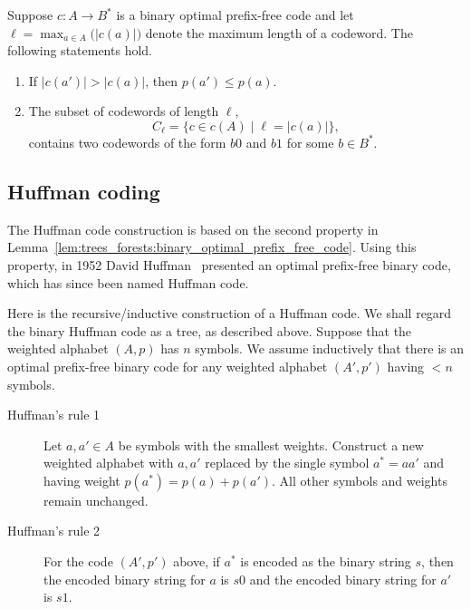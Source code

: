 \begin{lemma}
\label{lem:trees_forests:binary_optimal_prefix_free_code}
Suppose $c: A \longrightarrow B^*$ is a binary optimal prefix-free
code and let $\ell = \max_{a \in A} \big(|c(a)|\big)$ denote the
maximum length of a codeword. The following statements hold.
%
\begin{enumerate}
\item If $|c(a')|>|c(a)|$, then $p(a')\leq p(a)$.

\item The subset of codewords of length $\ell$,
\[
C_\ell
=
\{c \in c(A) \;|\; \ell = |c(a)|\},
\]
contains two codewords of the form $b0$ and $b1$ for some $b \in B^*$.
\end{enumerate}
\end{lemma}



\subsection{Huffman coding}

The Huffman code construction is based on the second property in
Lemma~\ref{lem:trees_forests:binary_optimal_prefix_free_code}. Using
this property, in 1952 David Huffman~\cite{Huffman1952} presented an
optimal prefix-free binary code, which has since been named Huffman
code.

Here is the recursive/inductive construction of a Huffman code. We
shall regard the binary Huffman code as a tree, as described
above. Suppose that the weighted alphabet $(A,p)$ has $n$ symbols. We
assume inductively that there is an optimal prefix-free binary code
for any weighted alphabet $(A',p')$ having $<n$ symbols.

\begin{description}
\item[Huffman's rule 1] Let $a,a' \in A$ be symbols with the smallest
  weights. Construct a new weighted alphabet with $a,a'$ replaced by
  the single symbol $a^* = aa'$ and having weight
  $p(a^*) = p(a) + p(a')$. All other symbols and weights remain
  unchanged.

\item[Huffman's rule 2] For the code $(A',p')$ above, if $a^*$ is
  encoded as the binary string $s$, then the encoded binary string for
  $a$ is $s0$ and the encoded binary string for $a'$ is $s1$.
\end{description}


